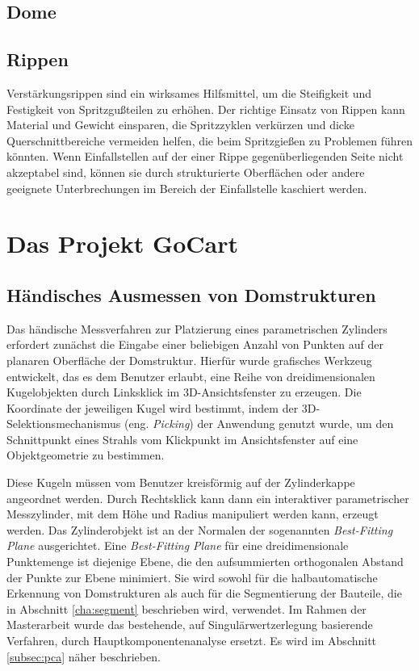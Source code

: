 \subsection{Dome}
\label{dome}



\subsection{Rippen}
Verst\"arkungsrippen sind ein wirksames Hilfsmittel, um die Steifigkeit und Festigkeit von Spritzgu{\ss}teilen zu erhöhen.
Der richtige Einsatz von Rippen kann Material und Gewicht einsparen, die Spritzzyklen verkürzen und dicke Querschnittbereiche vermeiden helfen, die beim Spritzgie{\ss}en zu Problemen führen könnten. Wenn Einfallstellen auf der einer Rippe
gegen\"uberliegenden Seite nicht akzeptabel sind, k\"onnen sie durch strukturierte Oberflächen oder andere geeignete Unterbrechungen im Bereich der Einfallstelle kaschiert werden.

\section{Das Projekt GoCart}
\label{goCart}

\subsection{H\"andisches Ausmessen von Domstrukturen}
\label{domeMeasure}

Das h\"andische Messverfahren zur Platzierung eines parametrischen Zylinders erfordert zun\"achst die Eingabe einer beliebigen Anzahl von Punkten auf der planaren Oberfl\"ache der Domstruktur. Hierf\"ur wurde grafisches Werkzeug entwickelt, das es dem Benutzer erlaubt, eine Reihe von dreidimensionalen Kugelobjekten durch Linksklick im 3D-Ansichtsfenster zu erzeugen. Die Koordinate der jeweiligen Kugel wird bestimmt, indem der 3D-Selektionsmechanismus (eng. \textit{Picking}) der Anwendung genutzt wurde, um den Schnittpunkt eines Strahls vom Klickpunkt im Ansichtsfenster auf eine Objektgeometrie zu bestimmen.

Diese Kugeln m\"ussen vom Benutzer kreisf\"ormig auf der Zylinderkappe angeordnet werden. Durch Rechtsklick kann dann ein interaktiver parametrischer Messzylinder, mit dem H\"ohe und Radius manipuliert werden kann, erzeugt werden. Das Zylinderobjekt ist an der Normalen der sogenannten \textit{Best-Fitting Plane} ausgerichtet. Eine \textit{Best-Fitting Plane} f\"ur eine dreidimensionale Punktemenge ist diejenige Ebene, die den aufsummierten orthogonalen Abstand der Punkte zur Ebene minimiert. Sie wird sowohl f\"ur die halbautomatische Erkennung von Domstrukturen als auch f\"ur die Segmentierung der Bauteile, die in Abschnitt \ref{cha:segment} beschrieben wird, verwendet. Im Rahmen der Masterarbeit wurde das bestehende, auf Singulärwertzerlegung basierende Verfahren, durch Hauptkomponentenanalyse ersetzt. Es wird im Abschnitt \ref{subsec:pca} näher beschrieben.

